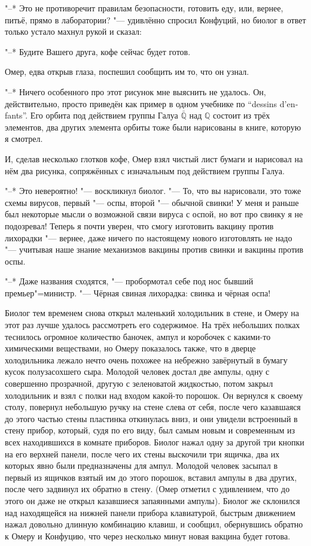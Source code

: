 "--* Это не противоречит правилам безопасности, готовить еду, или, вернее, питьё,
прямо в лаборатории? "--- удивлённо спросил Конфуций, но биолог в ответ только
устало махнул рукой и сказал:

"--* Будите Вашего друга, кофе сейчас будет готов.

Омер, едва открыв глаза, поспешил сообщить им то, что он узнал.

"--* Ничего особенного про этот рисунок мне выяснить не удалось.
Он, действительно, просто приведён как пример в одном учебнике по
\enquote{\foreignlanguage{french}{dessins d'enfants}}.
Его орбита под действием группы Галуа $\bar{\mathbb{Q}}$ над $\mathbb{Q}$
состоит из трёх элементов, два других элемента орбиты тоже были нарисованы в
книге, которую я смотрел.

И, сделав несколько глотков кофе, Омер взял чистый лист бумаги и нарисовал на
нём два рисунка, сопряжённых с изначальным под действием группы Галуа.

"--* Это невероятно! "--- воскликнул биолог.
"--- То, что вы нарисовали, это тоже схемы вирусов, первый "--- оспы, второй
"--- обычной свинки!
У меня и раньше был некоторые мысли о возможной связи вируса с оспой, но вот
про свинку я не подозревал!
Теперь я почти уверен, что смогу изготовить вакцину против лихорадки "--- вернее,
даже ничего по настоящему нового изготовлять не надо "--- учитывая наше знание
механизмов вакцины против свинки и вакцины против оспы.

"--* Даже названия сходятся, "--- пробормотал себе под нос бывший
премьер"=министр.
"--- Чёрная свиная лихорадка: свинка и чёрная оспа!

Биолог тем временем снова открыл маленький холодильник в стене, и Омеру на этот
раз лучше удалось рассмотреть его содержимое.
На трёх небольших полках теснилось огромное количество баночек, ампул и
коробочек с какими-то химическими веществами, но Омеру показалось также, что в
дверце холодильника лежало нечто очень похожее на небрежно завёрнутый в бумагу
кусок полузасохшего сыра.
Молодой человек достал две ампулы, одну с совершенно прозрачной, другую с
зеленоватой жидкостью, потом закрыл холодильник и взял с полки над входом
какой-то порошок.
Он вернулся к своему столу, повернул небольшую ручку на стене слева от себя,
после чего казавшаяся до этого частью стены пластинка откинулась вниз, и они
увидели встроенный в стену прибор, который, судя по его виду, был самым новым и
современным из всех находившихся в комнате приборов.
Биолог нажал одну за другой три кнопки на его верхней панели, после чего их
стены выскочили три ящичка, два их которых явно были предназначены для ампул.
Молодой человек засыпал в первый из ящичков взятый им до этого порошок,
вставил ампулы в два других, после чего задвинул их обратно в стену.
(Омер отметил с удивлением, что до этого он даже не открыл казавшиеся запаянными
ампулы).
Биолог же склонился над находящейся на нижней панели прибора клавиатурой,
быстрым движением нажал довольно длинную комбинацию клавиш, и сообщил,
обернувшись обратно к Омеру и Конфуцию, что через несколько минут новая вакцина
будет готова.

